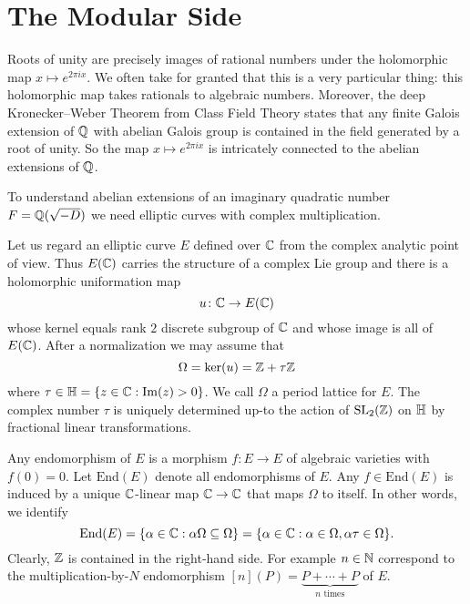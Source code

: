 

\section{The Modular Side}

Roots of unity are precisely images of rational numbers under the
holomorphic map $x\mapsto e^{2\pi i x}$. We often take for granted
that this is a very particular thing: this holomorphic map takes
rationals to algebraic numbers. Moreover, the deep Kronecker--Weber
Theorem from Class Field Theory states that any finite Galois
extension of ${\mathbb{Q}}$ with abelian Galois group is contained in the field
generated by a root of unity. So the map $x\mapsto e^{2\pi i x}$ is
intricately connected to the abelian extensions of ${\mathbb{Q}}$.

To understand abelian extensions of an imaginary quadratic number
$F={\mathbb{Q}}(\sqrt{-D})$ we need elliptic curves with complex
multiplication.

Let us regard an elliptic curve $E$ defined over ${\mathbb{C}}$ from the
complex analytic point of view. Thus $E({\mathbb{C}})$ carries the structure of
a complex Lie group and there is a holomorphic uniformation map
\begin{equation*}
  u \colon {\mathbb{C}} \rightarrow E({\mathbb{C}})
\end{equation*}
whose kernel equals rank $2$ discrete subgroup of ${\mathbb{C}}$ and whose
image is all of $E({\mathbb{C}})$. After a normalization we may assume that
\begin{equation*}
  \Omega = \mathrm{ker}(u) = {\mathbb{Z}}+\tau{\mathbb{Z}}
\end{equation*}
where $\tau\in {\mathbb{H}} = \{z\in {\mathbb{C}} : \mathrm{Im}(z)>0\}$. We call
$\Omega$ a period lattice for $E$. The complex number $\tau$ is
uniquely determined up-to the action of $\mathrm{SL}_2({\mathbb{Z}})$ on ${\mathbb{H}}$
by fractional linear transformations. 

Any endomorphism of $E$ is a morphism $f\colon E\rightarrow E$ of
algebraic varieties with $f(0)=0$. Let $\mathrm{End}(E)$ denote all
endomorphisms of $E$. Any $f\in \mathrm{End}(E)$ is
induced by a unique ${\mathbb{C}}$-linear map
${\mathbb{C}}\rightarrow {\mathbb{C}}$ that maps $\Omega$ to itself. In other words, we
identify
\begin{equation*}
  \mathrm{End}(E) = \{ \alpha\in{\mathbb{C}} : \alpha \Omega \subseteq \Omega \}
  = \{\alpha\in {\mathbb{C}} : \alpha\in \Omega, \alpha\tau\in \Omega\}. 
\end{equation*}
Clearly,  ${\mathbb{Z}}$ is contained in the right-hand side. For example  $n\in{\mathbb{N}}$
correspond to the multiplication-by-$N$ endomorphism $[n](P) =
\underbrace{P+\cdots +P}_{n\text{ times}}$ of $E$.

